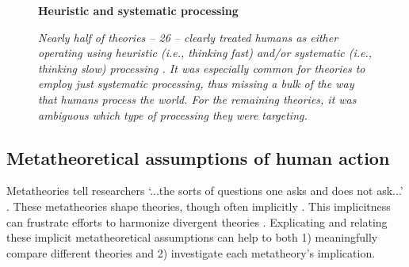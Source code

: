 \documentclass[12 pt]{article}
\begin{document}
\begin{figure}
	\centering
	\textbf{Heuristic and systematic processing}  \medskip
	\caption{\textit{Nearly half of theories -- 26 -- clearly treated humans as either operating using heuristic (i.e., thinking fast) and/or systematic (i.e., thinking slow) processing \parencite{Chaiken1980,Kahneman2011}. It was especially common for theories to employ just systematic processing, thus missing a bulk of the way that humans process the world. For the remaining theories, it was ambiguous which type of processing they were targeting.}}
	\label{fig:syst}
	
	
\end{figure}

\subsection{Metatheoretical assumptions of human action}
	 Metatheories tell researchers `...the sorts of questions one asks and
	does not ask...' \parencite[][p. 98]{Abrams2015}. These metatheories shape theories, though often implicitly \parencite{Fiedler2008}. This implicitness can frustrate efforts to harmonize divergent theories \parencite{Deci1976}. Explicating and relating these implicit metatheoretical assumptions can help to both 1) meaningfully compare different theories and 2) investigate each metatheory's  implication. 
	
\end{document}

